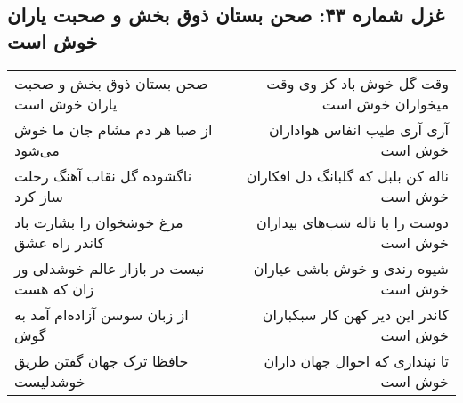 \begin{center}
\section*{غزل شماره ۴۳: صحن بستان ذوق بخش و صحبت یاران خوش است}
\label{sec:sh043}
\begin{longtable}{l p{0.5cm} r}
صحن بستان ذوق بخش و صحبت یاران خوش است
&&
وقت گل خوش باد کز وی وقت میخواران خوش است
\\
از صبا هر دم مشام جان ما خوش می‌شود
&&
آری آری طیب انفاس هواداران خوش است
\\
ناگشوده گل نقاب آهنگ رحلت ساز کرد
&&
ناله کن بلبل که گلبانگ دل افکاران خوش است
\\
مرغ خوشخوان را بشارت باد کاندر راه عشق
&&
دوست را با ناله شب‌های بیداران خوش است
\\
نیست در بازار عالم خوشدلی ور زان که هست
&&
شیوه رندی و خوش باشی عیاران خوش است
\\
از زبان سوسن آزاده‌ام آمد به گوش
&&
کاندر این دیر کهن کار سبکباران خوش است
\\
حافظا ترک جهان گفتن طریق خوشدلیست
&&
تا نپنداری که احوال جهان داران خوش است
\\
\end{longtable}
\end{center}

